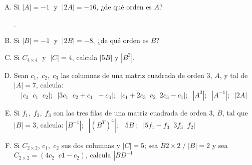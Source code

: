 \begin{enumerate}[Q. 1. ] 
	
\item Si $|A|=-1 \; \text{ y }\; |2A|=-16$, ¿de qué orden es $A$?

.

\item Si $|B|=-1 \; \text{ y }\; |2B|=-8$, ¿de qué orden es $B$?


\item Si $C_{4 \times 4} \;\text{ y } \; |C|=4$, calcula $|5B|$ y $|B^2|$.


\item Sean $c_1,\; c_2, \; c_3$ las columnas de una matriz cuadrada de orden $3$, $A$, y tal de $|A|=7$, calcula: $\quad |c_3\;\; c_1\; \;c_2|; \; \; |3c_1\;\; c_2+c_1\; \;-c_3|; \; \; |c_1+2c_3\;\; c_2\; \;2c_3-c_1|; \; \; |A^3|; \; \; |A^{-1}|;\;\;|2A|$


\item Si $f_1,\; f_2, \; f_3$ son las tres filas de una matriz cuadrada de orden $3$, $B$, tal que $|B|=3$, calcula: $|B^{-1}|; \; \; |(B^T)^4|; \; \; |5B|; \; \; |5f_1-f_3\;\; 3f_3\;\; f_2 |$


\item Si $C_{2 \times 2}$, $c_1, \; c_2$ sus dos columnas y $|C|=5$; sea $B{2\times 2} \; / \; |B|=2$ y sea $C_{2 \times 2}=(4c_2\; \; c1-c_2)$, calcula $|BD^{-1}|$



\end{enumerate}
